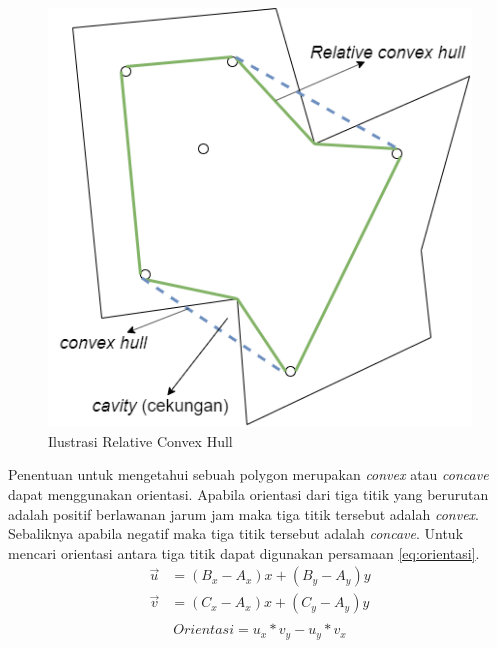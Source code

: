 \begin{figure}
	\Centering
	\includegraphics [width=0.5\columnwidth]{bab2/img/ilustrasi-relative-convex-hull}
	\caption {Ilustrasi Relative Convex Hull}
	\label {fig:ilustrasi-relative-convex-hull}
\end{figure}
\par Penentuan untuk mengetahui sebuah polygon merupakan \textit{convex} atau \textit{concave} dapat menggunakan orientasi. Apabila orientasi dari tiga titik yang berurutan adalah positif berlawanan jarum jam maka tiga titik tersebut adalah \textit{convex}. Sebaliknya apabila negatif maka tiga titik tersebut adalah \textit{concave}. Untuk mencari orientasi antara tiga titik dapat digunakan persamaan \ref{eq:orientasi}.
\begin{equation}
    \begin{aligned}
    \label{eq:orientasi}
        \vec{u}&=(B_x-A_x)x +(B_y-A_y)y\\
        \vec{v}&=(C_x-A_x)x +(C_y-A_y)y\\
    \end{aligned}
\end{equation}
$$ Orientasi = u_x*v_y - u_y*v_x $$
